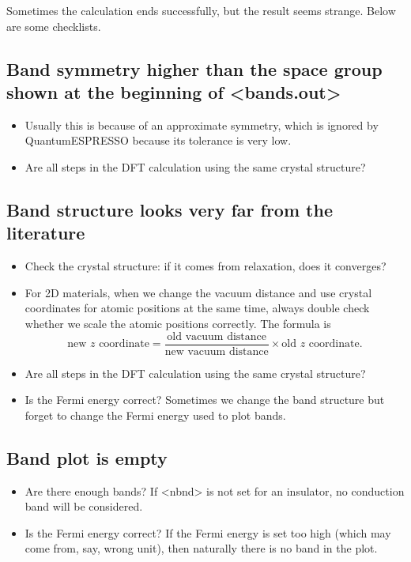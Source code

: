\documentclass[hyperref, a4paper]{report}
\def\texttt#1{<#1>}%
\newcommand{\shortcode}[1]{\texttt{#1}}
\begin{document}
Sometimes the calculation ends successfully,
but the result seems strange.
Below are some checklists.

\subsection{Band symmetry higher than the space group shown at the beginning of \shortcode{bands.out}}

\begin{itemize}
    \item Usually this is because of an approximate symmetry,
    which is ignored by QuantumESPRESSO because its tolerance is very low.
    \item Are all steps in the DFT calculation using the same crystal structure?
\end{itemize}

\subsection{Band structure looks very far from the literature}

\begin{itemize}
    \item Check the crystal structure: if it comes from relaxation,
    does it converges?
    \item For 2D materials, 
    when we change the vacuum distance
    and use crystal coordinates for atomic positions at the same time, 
    always double check whether we scale the atomic positions correctly.
    The formula is 
    \begin{equation}
        \text{new $z$ coordinate} = \frac{\text{old vacuum distance}}{\text{new vacuum distance}} \times \text{old $z$ coordinate}.
    \end{equation}
    \item Are all steps in the DFT calculation using the same crystal structure?
    \item Is the Fermi energy correct? 
    Sometimes we change the band structure but forget to change the Fermi energy used to plot bands.
\end{itemize}

\subsection{Band plot is empty}

\begin{itemize}
    \item Are there enough bands? 
    If \shortcode{nbnd} is not set for an insulator,
    no conduction band will be considered.
    \item Is the Fermi energy correct? If the Fermi energy is set too high 
    (which may come from, say, wrong unit), 
    then naturally there is no band in the plot.
\end{itemize}
\end{document}
